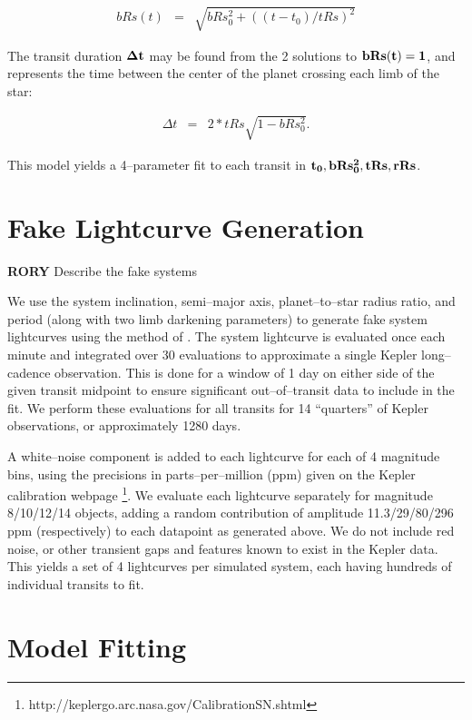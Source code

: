 \documentclass[prd, nofootinbib, floatfix, tightenlines, times]{article}
\begin{document}
\begin{eqnarray}
bRs(t) & = & \sqrt{bRs_0^2 + \left((t - t_0) / tRs\right)^2}
\end{eqnarray}

The transit duration ${\bf \Delta t}$ may be found from the 2
solutions to ${\bf bRs(t) = 1}$, and represents the time between the
center of the planet crossing each limb of the star:

\begin{eqnarray}
\Delta t & = & 2 * tRs \sqrt{1 - bRs_0^2}.
\label{eq-dt}
\end{eqnarray}


This model yields a 4--parameter fit to each transit in ${\bf t_0,
  bRs_0^2, tRs, rRs}$.

\section{Fake Lightcurve Generation}

{\bf RORY} Describe the fake systems

We use the system inclination, semi--major axis, planet--to--star
radius ratio, and period (along with two limb darkening parameters) to
generate fake system lightcurves using the method of
\cite{2002ApJ...580L.171M}.  The system lightcurve is evaluated once
each minute and integrated over 30 evaluations to approximate a single
Kepler long--cadence observation.  This is done for a window of 1 day
on either side of the given transit midpoint to ensure significant
out--of--transit data to include in the fit.  We perform these
evaluations for all transits for 14 ``quarters'' of Kepler
observations, or approximately 1280 days.

A white--noise component is added to each lightcurve for each of 4
magnitude bins, using the precisions in parts--per--million (ppm)
given on the Kepler calibration
webpage \footnote{http://keplergo.arc.nasa.gov/CalibrationSN.shtml}.
We evaluate each lightcurve separately for magnitude 8/10/12/14
objects, adding a random contribution of amplitude 11.3/29/80/296 ppm
(respectively) to each datapoint as generated above.  We do not
include red noise, or other transient gaps and features known to exist
in the Kepler data.  This yields a set of 4 lightcurves per simulated
system, each having hundreds of individual transits to fit.

\section{Model Fitting}
\end{document}
